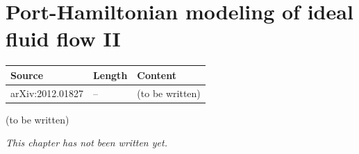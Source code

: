 \chapter{Port-Hamiltonian modeling of ideal fluid flow II}\label{ch:c25}
\begin{paracol}{2}

\begin{sources}
\begin{tabularx}{\linewidth}{@{}l l L@{}}
\toprule
\textbf{Source} & \textbf{Length} & \textbf{Content}\\
\midrule
arXiv:2012.01827 & -- & (to be written)\\
\bottomrule
\end{tabularx}

\end{sources}

\begin{reading}
(to be written)
\end{reading}

\emph{This chapter has not been written yet.}

\flushside
\end{paracol}
